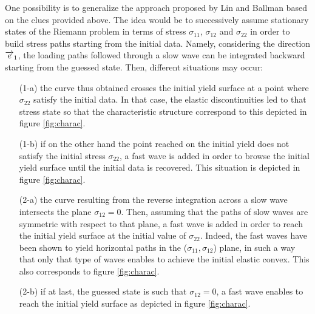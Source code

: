 One possibility is to generalize the approach proposed by Lin and Ballman \cite{Lin_et_Ballman} based on the clues provided above.
The idea would be to successively assume stationary states of the Riemann problem in terms of stress $\sigma_{11}$, $\sigma_{12}$ and $\sigma_{22}$ in order to build stress paths starting from the initial data.
Namely, considering the direction ${\overrightarrow{e}}_1$, the loading paths followed through a slow wave can be integrated backward starting from the guessed state.
Then, different situations may occur:
\begin{itemize}
\item[(1-a)] the curve thus obtained crosses the initial yield surface at a point where $\sigma_{22}$ satisfy the initial data.
  In that case, the elastic discontinuities led to that stress state so that the characteristic structure correspond to this depicted in figure \ref{fig:charac}.
\item[(1-b)] if on the other hand the point reached on the initial yield does not satisfy the initial stress $\sigma_{22}$, a fast wave is added in order to browse the initial yield surface until the initial data is recovered.
  This situation is depicted in figure \ref{fig:charac}.
\item[(2-a)] the curve resulting from the reverse integration across a slow wave intersects the plane $\sigma_{12}=0$.
  Then, assuming that the paths of slow waves are symmetric with respect to that plane, a fast wave is added in order to reach the initial yield surface at the initial value of $\sigma_{22}$.
  Indeed, the fast waves have been shown to yield horizontal paths in the ($\sigma_{11},\sigma_{12}$) plane, in such a way that only that type of waves enables to achieve the initial elastic convex.
  This also corresponds to figure \ref{fig:charac}.
\item[(2-b)] if at last, the guessed state is such that $\sigma_{12}=0$, a fast wave enables to reach the initial yield surface as depicted in figure \ref{fig:charac}.
\end{itemize}

